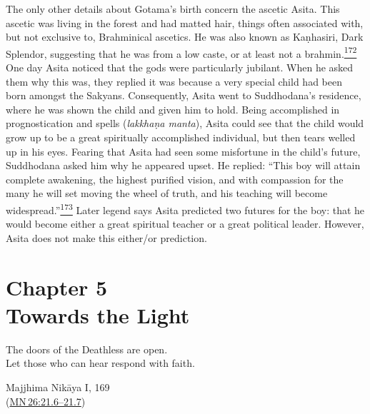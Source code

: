 The only other details about Gotama's birth concern the ascetic Asita.
This ascetic was living in the forest and had matted hair, things often
associated with, but not exclusive to, Brahminical ascetics. He was also
known as Kaṇhasiri, Dark Splendor, suggesting that he was from a low
caste, or at least not a
brahmin.\label{footprints_split_008.html_fnref172}\hyperref[footprints_split_024.htmlux5cux23fn172]{\textsuperscript{172}}
One day Asita noticed that the gods were particularly jubilant. When he
asked them why this was, they replied it was because a very special
child had been born amongst the Sakyans. Consequently, Asita went to
Suddhodana's residence, where he was shown the child and given him to
hold. Being accomplished in prognostication and spells (\emph{lakkhaṇa
manta}), Asita could see that the child would grow up to be a great
spiritually accomplished individual, but then tears welled up in his
eyes. Fearing that Asita had seen some misfortune in the child's future,
Suddhodana asked him why he appeared upset. He replied: ``This boy will
attain complete awakening, the highest purified vision, and with
compassion for the many he will set moving the wheel of truth, and his
teaching will become
widespread.''\label{footprints_split_008.html_fnref173}\hyperref[footprints_split_024.htmlux5cux23fn173]{\textsuperscript{173}}
Later legend says Asita predicted two futures for the boy: that he would
become either a great spiritual teacher or a great political leader.
However, Asita does not make this either/or prediction.

\label{footprints_split_008.html_calibre_pb_17}

\label{footprints_split_009.html}{}

\section{\texorpdfstring{{Chapter 5}\\
Towards the
Light}{Chapter 5 Towards the Light}}\label{footprints_split_009.html_TOCTarget5}

The doors of the Deathless are open.\\
Let those who can hear respond with faith.

Majjhima Nikāya I, 169\\
(\href{https://suttacentral.net/mn26/en/sujato\#21.6}{MN\,26:21.6--21.7})

